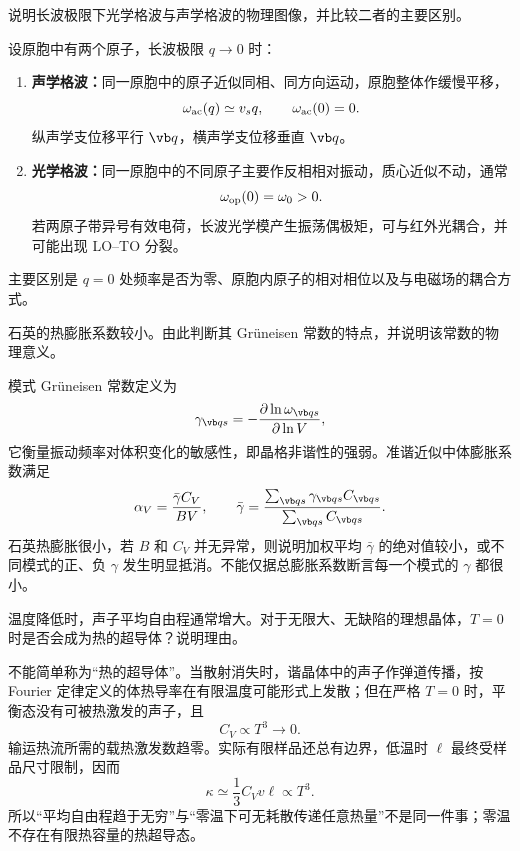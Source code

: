 \begin{question}[6 分]
说明长波极限下光学格波与声学格波的物理图像，并比较二者的主要区别。


\begin{solution}
设原胞中有两个原子，长波极限 $q\to0$ 时：
\begin{enumerate}
  \item \textbf{声学格波：}同一原胞中的原子近似同相、同方向运动，原胞整体作缓慢平移，
  \[
    \omega_{\rm ac}(q)\simeq v_sq,\qquad \omega_{\rm ac}(0)=0.
  \]
  纵声学支位移平行 $\vb q$，横声学支位移垂直 $\vb q$。
  \item \textbf{光学格波：}同一原胞中的不同原子主要作反相相对振动，质心近似不动，通常
  \[
    \omega_{\rm op}(0)=\omega_0>0.
  \]
  若两原子带异号有效电荷，长波光学模产生振荡偶极矩，可与红外光耦合，并可能出现 LO--TO 分裂。
\end{enumerate}
主要区别是 $q=0$ 处频率是否为零、原胞内原子的相对相位以及与电磁场的耦合方式。
\end{solution}
\end{question}

\begin{question}[6 分]
石英的热膨胀系数较小。由此判断其 Gr\"uneisen 常数的特点，并说明该常数的物理意义。


\begin{solution}
模式 Gr\"uneisen 常数定义为
\[
 \gamma_{\vb q s}=-\frac{\partial\ln\omega_{\vb q s}}{\partial\ln V},
\]
它衡量振动频率对体积变化的敏感性，即晶格非谐性的强弱。准谐近似中体膨胀系数满足
\[
 \alpha_V=\frac{\bar\gamma C_V}{BV},
 \qquad
 \bar\gamma=\frac{\sum_{\vb q s}\gamma_{\vb q s}C_{\vb q s}}
 {\sum_{\vb q s}C_{\vb q s}}.
\]
石英热膨胀很小，若 $B$ 和 $C_V$ 并无异常，则说明加权平均 $\bar\gamma$ 的绝对值较小，或不同模式的正、负 $\gamma$ 发生明显抵消。不能仅据总膨胀系数断言每一个模式的 $\gamma$ 都很小。
\end{solution}
\end{question}

\begin{question}[6 分]
温度降低时，声子平均自由程通常增大。对于无限大、无缺陷的理想晶体，$T=0$ 时是否会成为热的超导体？说明理由。


\begin{solution}
不能简单称为“热的超导体”。当散射消失时，谐晶体中的声子作弹道传播，按 Fourier 定律定义的体热导率在有限温度可能形式上发散；但在严格 $T=0$ 时，平衡态没有可被热激发的声子，且
\[
 C_V\propto T^3\longrightarrow0.
\]
输运热流所需的载热激发数趋零。实际有限样品还总有边界，低温时 $\ell$ 最终受样品尺寸限制，因而
\[
 \kappa\simeq\frac13C_Vv\ell\propto T^3.
\]
所以“平均自由程趋于无穷”与“零温下可无耗散传递任意热量”不是同一件事；零温不存在有限热容量的热超导态。
\end{solution}
\end{question}

